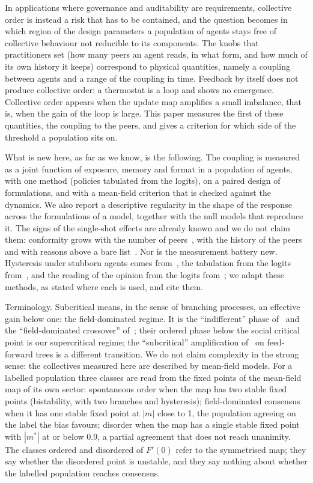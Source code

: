 \documentclass[11pt]{article}
\begin{document}
In applications where governance and auditability are requirements,
collective order is instead a risk that has to be contained, and the question becomes in
which region of the design parameters a population of agents stays free of
collective behaviour not reducible to its components. The knobs that practitioners set (how many peers an agent reads, in what form, and how much of its own history it keeps) correspond to physical quantities, namely a coupling between agents and a range of the coupling in time. Feedback by itself does not produce collective order: a thermostat is a loop and shows no emergence. Collective order appears when the update map amplifies a small imbalance, that is, when the gain of the loop is large. This paper measures the first of these quantities, the coupling to the peers, and gives a criterion for which side of the threshold a population sits on.

What is new here, as far as we know, is the following. The coupling is measured as a joint function of exposure, memory and format in a population of agents, with one method (policies tabulated from the logits), on a paired design of formulations, and with a mean-field criterion that is checked against the dynamics. We also report a descriptive regularity in the shape of the response across the formulations of a model, together with the null models that reproduce it. The signs of the
single-shot effects are already known and we do not claim them: conformity grows with the
number of peers~\cite{bellina2026}, with the history of the
peers~\cite{weng2025,ashery2025} and with reasons above a bare
list~\cite{cho2025}. Nor is the measurement battery new. Hysteresis under stubborn agents comes from~\cite{demarzo2026}, the tabulation from the
logits from~\cite{flint2026}, and the reading of the opinion from the logits from~\cite{brockers2026}; we adapt these methods, as stated where each is used, and cite them.

Terminology. Subcritical means, in the sense of branching processes, an
effective gain below one: the field-dominated regime. It is the
``indifferent'' phase of~\cite{el2026} and the ``field-dominated
crossover'' of~\cite{denobili2026}; their ordered phase below the social
critical point is our supercritical regime; the ``subcritical'' amplification
of~\cite{liu2026} on feed-forward trees is a different transition. We do
not claim complexity in the strong sense: the collectives measured here are
described by mean-field models. For a labelled population three classes
are read from the fixed points of the mean-field map of its own sector:
spontaneous order when the map has two stable fixed points (bistability,
with two branches and hysteresis); field-dominated consensus when it has
one stable fixed point at $|m|$ close to 1, the population agreeing on the
label the bias favours; disorder when the map has a single stable fixed
point with $|m^*|$ at or below 0.9, a partial agreement that does not reach
unanimity. The classes ordered and disordered of $F'(0)$ refer to the symmetrised map; they say whether the disordered point is unstable, and they say nothing about whether the labelled population reaches consensus.
\end{document}

